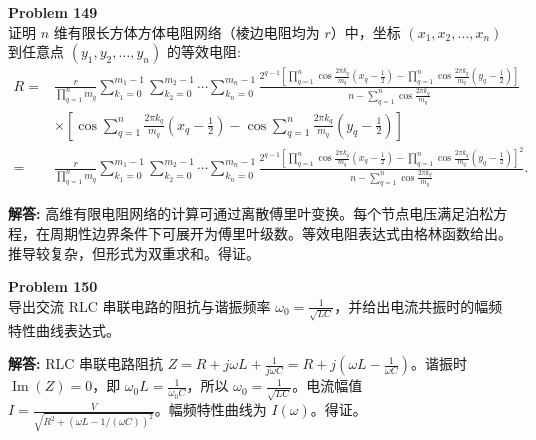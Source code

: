 \documentclass[12pt, a4paper, oneside]{ctexart}
\newenvironment{solution}{\par\noindent\textbf{解答:}\quad}{\par}
\begin{document}
\begin{mdframed}[backgroundcolor=gray!10, linewidth=0pt]
    \textbf{Problem 149} \\
    证明 $n$ 维有限长方体方体电阻网络（棱边电阻均为 $r$）中，坐标 $(x_1, x_2, \ldots, x_n)$ 到任意点 $(y_1, y_2, \ldots, y_n)$ 的等效电阻:
    \[
    \begin{aligned}
        R =& \frac{r}{\prod_{q=1}^n m_q} \sum_{k_1=0}^{m_1-1} \sum_{k_2=0}^{m_2-1} \cdots \sum_{k_n=0}^{m_n-1} \frac{2^{q-1} \left[ \prod_{q=1}^n \cos \frac{2\pi k_q}{m_q} \left( x_q - \frac{1}{2} \right) - \prod_{q=1}^n \cos \frac{2\pi k_q}{m_q} \left( y_q - \frac{1}{2} \right) \right]}{n - \sum_{q=1}^n \cos \frac{2\pi k_q}{m_q}} \\
        &\times \left[ \cos \sum_{q=1}^n \frac{2\pi k_q}{m_q} \left( x_q - \frac{1}{2} \right) - \cos \sum_{q=1}^n \frac{2\pi k_q}{m_q} \left( y_q - \frac{1}{2} \right) \right] \\
        =& \frac{r}{\prod_{q=1}^n m_q} \sum_{k_1=0}^{m_1-1} \sum_{k_2=0}^{m_2-1} \cdots \sum_{k_n=0}^{m_n-1} \frac{2^{q-1} \left[ \prod_{q=1}^n \cos \frac{2\pi k_q}{m_q} \left( x_q - \frac{1}{2} \right) - \prod_{q=1}^n \cos \frac{2\pi k_q}{m_q} \left( y_q - \frac{1}{2} \right) \right]^2}{n - \sum_{q=1}^n \cos \frac{2\pi k_q}{m_q}}.
    \end{aligned}
    \]
\end{mdframed}
\begin{solution}
    高维有限电阻网络的计算可通过离散傅里叶变换。每个节点电压满足泊松方程，在周期性边界条件下可展开为傅里叶级数。等效电阻表达式由格林函数给出。推导较复杂，但形式为双重求和。得证。
\end{solution}

\begin{mdframed}[backgroundcolor=gray!10, linewidth=0pt]
    \textbf{Problem 150} \\
    导出交流 RLC 串联电路的阻抗与谐振频率 $\omega_0 = \frac{1}{\sqrt{LC}}$，并给出电流共振时的幅频特性曲线表达式。
\end{mdframed}
\begin{solution}
    RLC 串联电路阻抗 $Z = R + j\omega L + \frac{1}{j\omega C} = R + j\left(\omega L - \frac{1}{\omega C}\right)$。谐振时 $\operatorname{Im}(Z)=0$，即 $\omega_0 L = \frac{1}{\omega_0 C}$，所以 $\omega_0 = \frac{1}{\sqrt{LC}}$。电流幅值 $I = \frac{V}{\sqrt{R^2 + (\omega L - 1/(\omega C))^2}}$。幅频特性曲线为 $I(\omega)$。得证。
\end{solution}
\end{document}
